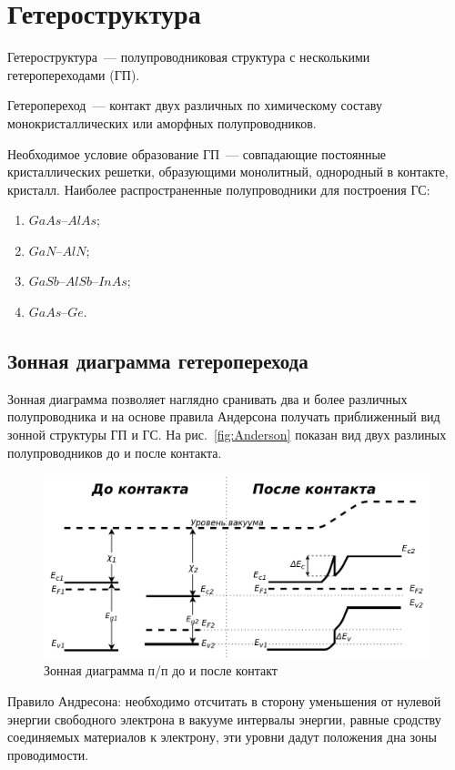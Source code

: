 \section{Гетероструктура}
Гетероструктура~--- полупроводниковая структура с несколькими гетеропереходами (ГП). 

Гетеропереход~--- контакт двух различных по химическому составу монокристаллических или аморфных полупроводников.

Необходимое условие образование ГП~--- совпадающие постоянные кристаллических решетки, образующими монолитный, однородный в контакте, кристалл.
Наиболее распространенные полупроводники для построения ГС:
\begin{enumerate}
  \item $GaAs$--$AlAs$;
  \item $GaN$--$AlN$;
  \item $GaSb$--$AlSb$--$InAs$;
  \item $GaAs$--$Ge$.
\end{enumerate}

\subsection{Зонная диаграмма гетероперехода}
Зонная диаграмма позволяет наглядно сранивать два и более различных полупроводника и на основе правила Андерсона получать приближенный вид зонной структуры ГП и ГС. На рис.~\ref{fig:Anderson} показан вид двух разлиных полупроводников до и после контакта.

\begin{figure}[h]
	\centering
	\includegraphics[width=.9\linewidth]{assets/HJ}
	\caption{Зонная диаграмма п/п до и после контакт}
	\label{fig:zone}
\end{figure}

Правило Андресона: необходимо отсчитать в сторону уменьшения от нулевой энергии свободного электрона в вакууме интервалы энергии, равные сродству соединяемых материалов к электрону, эти уровни дадут положения дна зоны проводимости.

